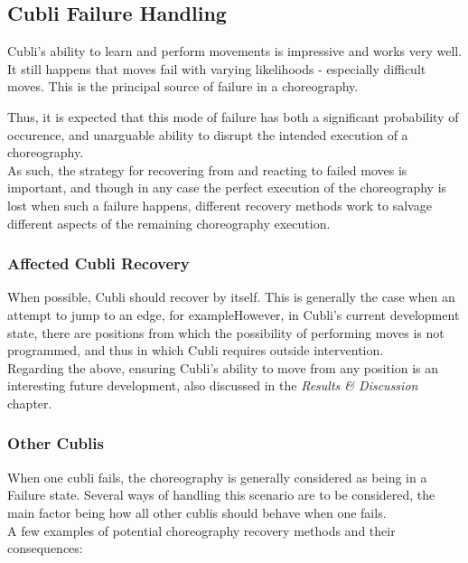 \subsection{Cubli Failure Handling}

Cubli's ability to learn and perform movements is impressive and works very well. It still happens that moves fail with varying likelihoods - especially difficult moves. This is the principal source of failure in a choreography.

Thus, it is expected that this mode of failure has both a significant probability of occurence, and unarguable ability to disrupt the intended execution of a choreography.\\

As such, the strategy for recovering from and reacting to failed moves is important, and though in any case the perfect execution of the choreography is lost when such a failure happens, different recovery methods work to salvage different aspects of the remaining choreography execution.

\subsubsection{Affected Cubli Recovery}

When possible, Cubli should recover by itself. This is generally the case when an attempt to jump to an edge, for exampleHowever, in Cubli's current development state, there are positions from which the possibility of performing moves is not programmed, and thus in which Cubli requires outside intervention.\\

Regarding the above, ensuring Cubli's ability to move from any position is an interesting future development, also discussed in the \textit{Results \& Discussion} chapter.



\subsubsection{Other Cublis}

When one cubli fails, the choreography is generally considered as being in a Failure state. Several ways of handling this scenario are to be considered, the main factor being how all other cublis should behave when one fails.\\

A few examples of potential choreography recovery methods and their consequences:\\

